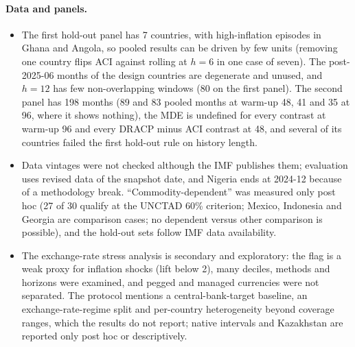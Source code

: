 \paragraph{Data and panels.}
\begin{itemize}
\item[(3, 12, 17)] The first hold-out panel has 7 countries, with high-inflation episodes in Ghana and Angola, so pooled results can be driven by few units (removing one country flips ACI against rolling at $h=6$ in one case of seven). The post-2025-06 months of the design countries are degenerate and unused, and $h=12$ has few non-overlapping windows (80 on the first panel). The second panel has 198 months (89 and 83 pooled months at warm-up 48, 41 and 35 at 96, where it shows nothing), the MDE is undefined for every contrast at warm-up 96 and every DRACP minus ACI contrast at 48, and several of its countries failed the first hold-out rule on history length.
\item[(5, 7)] Data vintages were not checked although the IMF publishes them; evaluation uses revised data of the snapshot date, and Nigeria ends at 2024-12 because of a methodology break. ``Commodity-dependent'' was measured only post hoc (27 of 30 qualify at the UNCTAD 60\% criterion; Mexico, Indonesia and Georgia are comparison cases; no dependent versus other comparison is possible), and the hold-out sets follow IMF data availability.
\item[(10, 11)] The exchange-rate stress analysis is secondary and exploratory: the flag is a weak proxy for inflation shocks (lift below 2), many deciles, methods and horizons were examined, and pegged and managed currencies were not separated. The protocol mentions a central-bank-target baseline, an exchange-rate-regime split and per-country heterogeneity beyond coverage ranges, which the results do not report; native intervals and Kazakhstan are reported only post hoc or descriptively.
\end{itemize}

